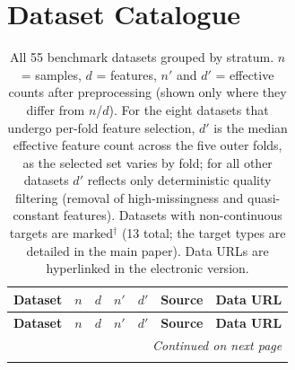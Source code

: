 
\section{Dataset Catalogue}
\label{sec:dataset-catalogue}

{\footnotesize
\setlength{\tabcolsep}{3pt}
\begin{longtable}{@{}lrrrrlp{3.5cm}@{}}
\caption{All 55 benchmark datasets grouped by stratum.  $n$ = samples, $d$ = features, $n'$ and $d'$ = effective counts after preprocessing (shown only where they differ from $n$/$d$).  For the eight datasets that undergo per-fold feature selection, $d'$ is the median effective feature count across the five outer folds, as the selected set varies by fold; for all other datasets $d'$ reflects only deterministic quality filtering (removal of high-missingness and quasi-constant features).  Datasets with non-continuous targets are marked$^\dagger$ (13 total; the target types are detailed in the main paper).  Data URLs are hyperlinked in the electronic version.}
\label{tab:dataset-catalogue} \\
\toprule
\textbf{Dataset} & \textbf{$n$} & \textbf{$d$} & \textbf{$n'$} & \textbf{$d'$} & \textbf{Source} & \textbf{Data URL} \\
\midrule
\endfirsthead
\toprule
\textbf{Dataset} & \textbf{$n$} & \textbf{$d$} & \textbf{$n'$} & \textbf{$d'$} & \textbf{Source} & \textbf{Data URL} \\
\midrule
\endhead
\midrule \multicolumn{7}{r}{\emph{Continued on next page}} \\
\endfoot
\bottomrule
\endlastfoot


\end{longtable}}
